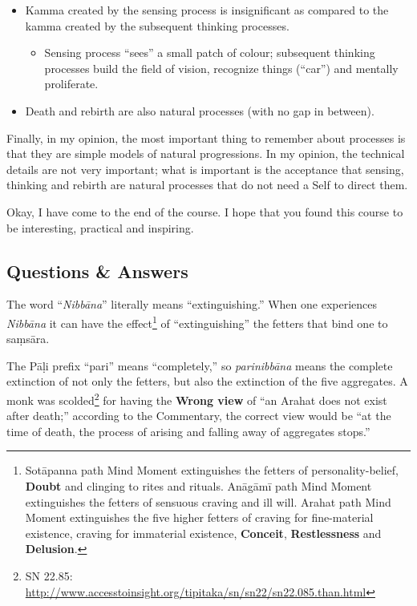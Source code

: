 \begin{itemize}
\item Kamma created by the sensing process is insignificant as compared to the kamma created by the subsequent thinking processes.

\begin{itemize}

\item Sensing process “sees” a small patch of colour; subsequent thinking processes build the field of vision, recognize things (“car”) and mentally proliferate.

\end{itemize}

\item Death and rebirth are also natural processes (with no gap in between).

\end{itemize}

Finally, in my opinion, the most important thing to remember about processes is that they are simple models of natural progressions. In my opinion, the technical details are not very important; what is important is the acceptance that sensing, thinking and rebirth are natural processes that do not need a Self to direct them.

Okay, I have come to the end of the course. I hope that you found this course to be interesting, practical and inspiring.

\newpage

\subsection*{Questions \& Answers}


The word “\textit{Nibbāna}” literally means “extinguishing.” When one experiences \textit{Nibbāna} it can have the effect\footnote{Sotāpanna path Mind Moment extinguishes the fetters of personality-belief, \textbf{Doubt} and clinging to rites and rituals. Anāgāmī path Mind Moment extinguishes the fetters of sensuous craving and ill will. Arahat path Mind Moment extinguishes the five higher fetters of craving for fine-material existence, craving for immaterial existence, \textbf{Conceit}, \textbf{Restlessness} and \textbf{Delusion}.} of “extinguishing” the fetters that bind one to saṃsāra.

The Pāḷi prefix “pari” means “completely,” so \textit{parinibbāna} means the complete extinction of not only the fetters, but also the extinction of the five aggregates. A monk was scolded\footnote{SN 22.85: \url{ http://www.accesstoinsight.org/tipitaka/sn/sn22/sn22.085.than.html}} for having the \textbf{Wrong view} of “an Arahat does not exist after death;” according to the Commentary, the correct view would be “at the time of death, the process of arising and falling away of aggregates stops.”

